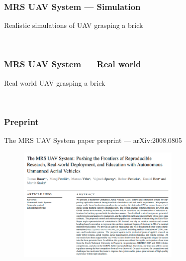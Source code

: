 \documentclass[aspectratio=1610]{beamer}
\begin{document}
  \begin{frame}
    \frametitle{MRS UAV System --- Simulation}

    \begin{block}{Realistic simulations of UAV grasping a brick}
      \begin{center}
        \\
      \end{center}
    \end{block}

  \end{frame}

  \begin{frame}
    \frametitle{MRS UAV System --- Real world}

    \begin{block}{Real world UAV grasping a brick}
      \begin{center}
        \\
      \end{center}
    \end{block}

  \end{frame}


  \begin{frame}
    \frametitle{Preprint}

    \begin{block}{The MRS UAV System paper preprint --- arXiv:2008.0805}
      \begin{figure}
        \includegraphics[width=0.7\textwidth]{fig/mrs_uav_system_paper.png}
      \end{figure}
    \end{block}

  \end{frame}
\end{document}
